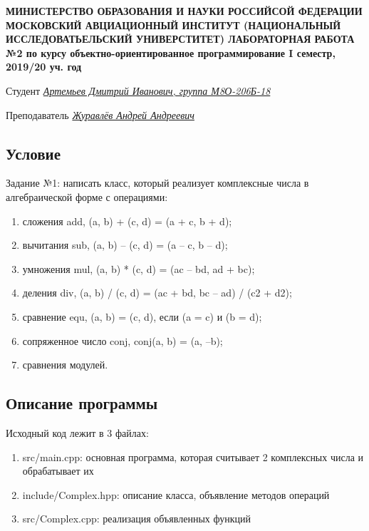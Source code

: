\documentclass[12pt]{article}
\begin{document}
\begin{titlepage}
\begin{center}
\textbf{МИНИСТЕРСТВО ОБРАЗОВАНИЯ И НАУКИ РОССИЙСОЙ ФЕДЕРАЦИИ
\medskip
МОСКОВСКИЙ АВЦИАЦИОННЫЙ ИНСТИТУТ
(НАЦИОНАЛЬНЫЙ ИССЛЕДОВАТЬЕЛЬСКИЙ УНИВЕРСТИТЕТ)
\vfill\vfill
{\Huge ЛАБОРАТОРНАЯ РАБОТА №2} 
по курсу объектно-ориентированное программирование
I семестр, 2019/20 уч. год}
\end{center}
\vfill

Студент \uline{\it {Артемьев Дмитрий Иванович, группа М8О-206Б-18}\hfill}

Преподаватель \uline{\it {Журавлёв Андрей Андреевич}\hfill}

\vfill
\end{titlepage}

\subsection*{Условие}

Задание №1: написать класс, который реализует комплексные числа в алгебраической форме с операциями: 
\begin{enumerate}
\item сложения add, (a, b) + (c, d) = (a + c, b + d);
\item вычитания sub, (a, b) – (c, d) = (a – c, b – d);
\item умножения mul, (a, b) * (c, d) = (ac – bd, ad + bc);
\item деления div, (a, b) / (c, d) = (ac + bd, bc – ad) / (c2 + d2);
\item сравнение equ, (a, b) = (c, d), если (a = c) и (b = d);
\item сопряженное число conj, conj(a, b) = (a, –b);
\item сравнения модулей.
\end{enumerate}

\subsection*{Описание программы}

Исходный код лежит в 3 файлах:
\begin{enumerate}
\item src/main.cpp: основная программа, которая считывает 2 комплексных числа и обрабатывает их 
\item include/Complex.hpp: описание класса, объявление методов операций
\item src/Complex.cpp: реализация объявленных функций
\end{enumerate}
\end{document}
